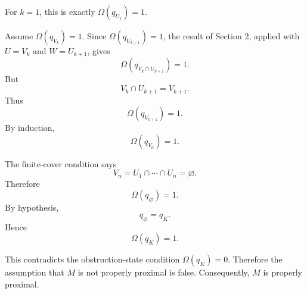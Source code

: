 For \(k=1\), this is exactly \(\Omega(q_{U_1})=1\).

Assume \(\Omega(q_{V_k})=1\). Since \(\Omega(q_{U_{k+1}})=1\), the result of Section 2, applied with \(U=V_k\) and \(W=U_{k+1}\), gives
\[
\Omega(q_{V_k\cap U_{k+1}})=1.
\]
But
\[
V_k\cap U_{k+1}=V_{k+1}.
\]
Thus
\[
\Omega(q_{V_{k+1}})=1.
\]
By induction,
\[
\Omega(q_{V_n})=1.
\]

The finite-cover condition says
\[
V_n=U_1\cap\cdots\cap U_n=\varnothing.
\]
Therefore
\[
\Omega(q_{\varnothing})=1.
\]
By hypothesis,
\[
q_{\varnothing}=q_K.
\]
Hence
\[
\Omega(q_K)=1.
\]

This contradicts the obstruction-state condition \(\Omega(q_K)=0\). Therefore the assumption that \(M\) is not properly proximal is false. Consequently, \(M\) is properly proximal.